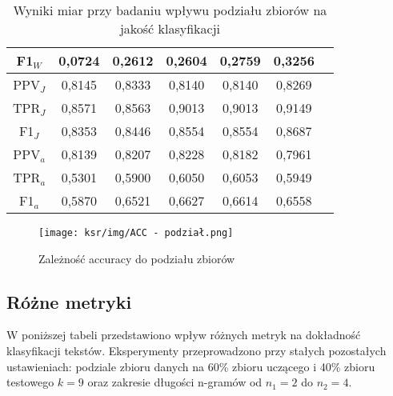 \documentclass{article}
\begin{document}
\begin{table}[H]
\begin{tabular}{|c|c|c|c|c|c|c}
    F1\(_W\) & 0,0724 & 0,2612 & 0,2604 & 0,2759 & 0,3256\\ \hline
    PPV\(_J\) & 0,8145 & 0,8333 & 0,8140 & 0,8140 & 0,8269\\ \hline
    TPR\(_J\) & 0,8571 & 0,8563 & 0,9013 & 0,9013 & 0,9149\\ \hline
    F1\(_J\) & 0,8353 & 0,8446 & 0,8554 & 0,8554 & 0,8687\\ \hline
    PPV\(_a\) & 0,8139 & 0,8207 & 0,8228 & 0,8182 & 0,7961 \\ \hline
    TPR\(_a\) & 0,5301 & 0,5900 & 0,6050 & 0,6053 & 0,5949\\ \hline
    F1\(_a\) & 0,5870 & 0,6521 & 0,6627 & 0,6614 & 0,6558\\ \hline
    \end{tabular}
    \caption{Wyniki miar przy badaniu wpływu podziału zbiorów na jakość klasyfikacji}
\end{table}
\begin{figure}[H]
    \centering
    \texttt{[image: ksr/img/ACC - podział.png]}
    \caption{Zależność accuracy do podziału zbiorów }
    \label{fig:moj-obraz}
\end{figure}

\subsection{Różne metryki}
W poniższej tabeli przedstawiono wpływ różnych metryk na dokładność klasyfikacji tekstów. Eksperymenty przeprowadzono przy stałych pozostałych ustawieniach: podziale zbioru danych na 60\% zbioru uczącego i 40\% zbioru testowego \(k = 9\) oraz zakresie długości n-gramów od \(n_1 = 2\) do \(n_2 = 4\). \\
\end{document}
